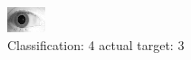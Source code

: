 \begin{figure}[h!]
\begin{center}
\includegraphics[width=0.60\columnwidth]{figures/ID1947_class_4_target_3.png}
\end{center}
\caption{ Classification: 4 actual target: 3}
\label{fig:ID1947_class_4_target_3}
\end{figure}
